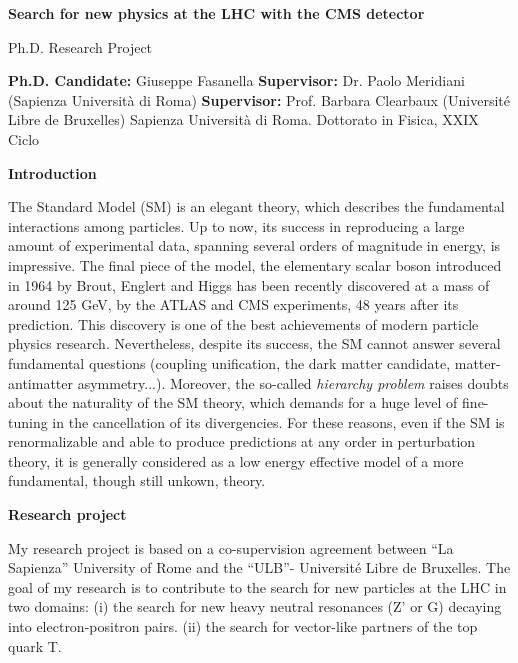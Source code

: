 \documentclass[a4paper,11pt]{article}
\begin{document}
\begin{center}
\Large{\textbf{Search for new physics at the LHC with the CMS detector}}
\end{center}

\begin{center}
 Ph.D. Research Project
\end{center}

\begin{center}
\textbf{Ph.D. Candidate:} Giuseppe Fasanella
\newline
\textbf{Supervisor:} Dr. Paolo Meridiani (Sapienza Università di Roma)
\newline
\textbf{Supervisor:} Prof. Barbara Clearbaux (Université Libre de Bruxelles)
\newline
\newline
\small{Sapienza Università di Roma. Dottorato in Fisica, XXIX Ciclo}
\end{center}

\bigskip
\large{\textbf{Introduction}}

\smallskip
The Standard Model (SM) is an elegant theory, which describes the fundamental interactions among particles. %
Up to now, its success in reproducing a large amount of experimental data, spanning several orders of magnitude in energy, is impressive.
The final piece of the model, the elementary scalar boson introduced in 1964 by Brout, Englert  and Higgs %
has been recently discovered at a mass of around 125 GeV, by the  ATLAS and CMS experiments, 48 years after its prediction. This discovery is one of the best achievements of modern particle physics research. Nevertheless, despite its success, 
the SM cannot answer several fundamental questions (coupling unification, the dark matter candidate, matter-antimatter 
asymmetry...). Moreover, the so-called \textit{hierarchy problem} raises doubts about the naturality of the SM theory, which demands for a
huge level of fine-tuning in the cancellation of its divergencies.
For these reasons, even if the SM is renormalizable and able to produce predictions at any order in perturbation theory, it is
generally considered as a low energy effective model of a more fundamental, though still unkown, theory.

\medskip
\large{\textbf{Research project}} 

\smallskip
My research project is based on a co-supervision agreement between ``La Sapienza'' University of Rome and 
the ``ULB''- Université Libre de Bruxelles.
The goal of my research is to contribute to the search for new particles at the LHC in two domains:
(i) the search for new heavy neutral resonances (Z’ or G) decaying into electron-positron 
pairs. %
(ii) the search for vector-like partners of the top quark T. 
\end{document}
